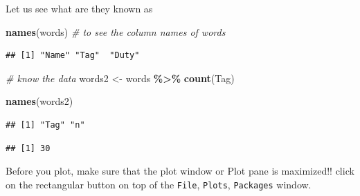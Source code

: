 \documentclass[
]{book}
\newenvironment{Shaded}{\begin{snugshade}}{\end{snugshade}}
\newcommand{\CommentTok}[1]{\textcolor[rgb]{0.56,0.35,0.01}{\textit{#1}}}
\newcommand{\FunctionTok}[1]{\textcolor[rgb]{0.13,0.29,0.53}{\textbf{#1}}}
\newcommand{\NormalTok}[1]{#1}
\newcommand{\OtherTok}[1]{\textcolor[rgb]{0.56,0.35,0.01}{#1}}
\newcommand{\SpecialCharTok}[1]{\textcolor[rgb]{0.81,0.36,0.00}{\textbf{#1}}}
\begin{document}
Let us see what are they known as

\begin{Shaded}
\begin{Highlighting}[]
\FunctionTok{names}\NormalTok{(words) }\CommentTok{\# to see the column names of words}
\end{Highlighting}
\end{Shaded}

\begin{verbatim}
## [1] "Name" "Tag"  "Duty"
\end{verbatim}

\begin{Shaded}
\begin{Highlighting}[]
\CommentTok{\# know the data}
\NormalTok{words2 }\OtherTok{\textless{}{-}}\NormalTok{ words }\SpecialCharTok{\%\textgreater{}\%} \FunctionTok{count}\NormalTok{(Tag)}

\FunctionTok{names}\NormalTok{(words2)}
\end{Highlighting}
\end{Shaded}

\begin{verbatim}
## [1] "Tag" "n"
\end{verbatim}

\begin{Shaded}
\end{Shaded}

\begin{verbatim}
## [1] 30
\end{verbatim}

Before you plot, make sure that the plot window or Plot pane is maximized!! click on the rectangular button on top of the \texttt{File}, \texttt{Plots}, \texttt{Packages} window.
\end{document}
